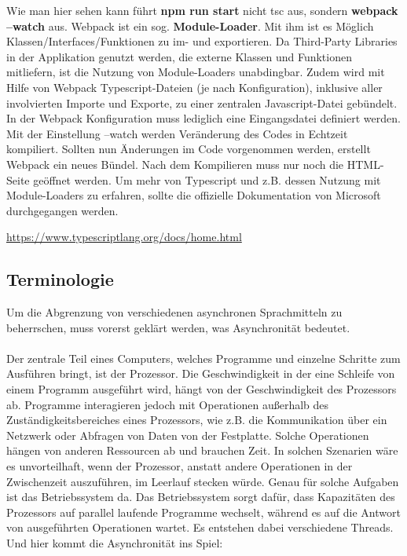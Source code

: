 \noindent
Wie man hier sehen kann führt \textbf{npm run start} nicht tsc aus, sondern \textbf{webpack --watch} aus. Webpack ist ein sog. \textbf{Module-Loader}. Mit ihm ist es Möglich Klassen/Interfaces/Funktionen zu im- und exportieren. Da Third-Party Libraries in der Applikation genutzt werden, die externe Klassen und Funktionen mitliefern, ist die Nutzung von Module-Loaders unabdingbar. Zudem wird mit Hilfe von Webpack Typescript-Dateien (je nach Konfiguration), inklusive aller involvierten Importe und Exporte, zu einer zentralen Javascript-Datei gebündelt. In der Webpack Konfiguration muss lediglich eine Eingangsdatei definiert werden. Mit der Einstellung --watch werden Veränderung des Codes in Echtzeit kompiliert. Sollten nun Änderungen im Code vorgenommen werden, erstellt Webpack ein neues Bündel. Nach dem Kompilieren muss nur noch die HTML-Seite geöffnet werden. Um mehr von Typescript und z.B. dessen Nutzung mit Module-Loaders zu erfahren, sollte die offizielle Dokumentation von Microsoft durchgegangen werden.

\begin{center}
\url{https://www.typescriptlang.org/docs/home.html} 
\end{center}

\subsection{Terminologie}

Um die Abgrenzung von verschiedenen asynchronen Sprachmitteln zu beherrschen, muss vorerst geklärt werden, was Asynchronität bedeutet.\\\\

\noindent
Der zentrale Teil eines Computers, welches Programme und einzelne Schritte zum Ausführen bringt, ist der Prozessor. Die Geschwindigkeit in der eine Schleife von einem Programm ausgeführt wird, hängt von der Geschwindigkeit des Prozessors ab. Programme interagieren jedoch mit Operationen außerhalb des Zuständigkeitsbereiches eines Prozessors, wie z.B. die Kommunikation über ein Netzwerk oder Abfragen von Daten von der Festplatte. Solche Operationen hängen von anderen Ressourcen ab und brauchen Zeit. In solchen Szenarien wäre es unvorteilhaft, wenn der Prozessor, anstatt andere Operationen in der Zwischenzeit auszuführen, im Leerlauf stecken würde. Genau für solche Aufgaben ist das Betriebssystem da. Das Betriebssystem sorgt dafür, dass Kapazitäten des Prozessors auf parallel laufende Programme wechselt, während es auf die Antwort von ausgeführten Operationen wartet. Es entstehen dabei verschiedene \glqq Threads\grqq{}. Und hier kommt die Asynchronität ins Spiel:


